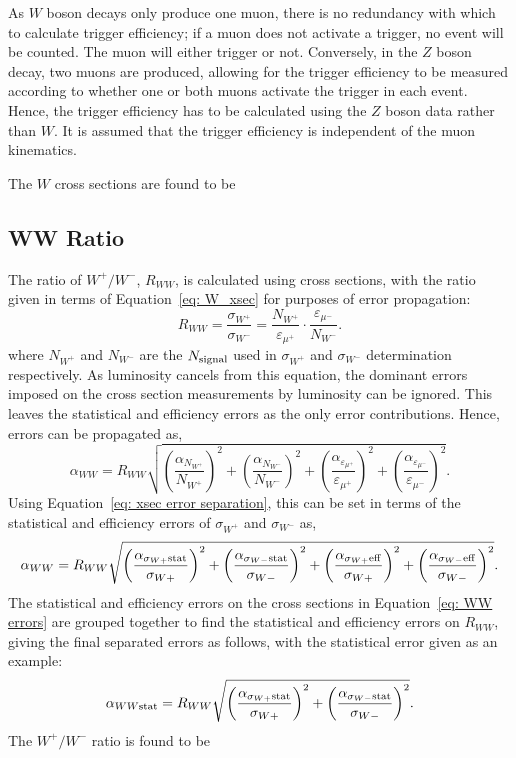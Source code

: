 \documentclass[a4paper]{article}
\begin{document}
As $W$ boson decays only produce one muon, there is no redundancy with which to calculate trigger efficiency; if a muon does not activate a trigger, no event will be counted. The muon will either trigger or not. Conversely, in the $Z$ boson decay, two muons are produced, allowing for the trigger efficiency to be measured according to whether one or both muons activate the trigger in each event. Hence, the trigger efficiency has to be calculated using the $Z$ boson data rather than $W$. It is assumed that the trigger efficiency is independent of the muon kinematics.

The $W$ cross sections are found to be



\subsection{WW Ratio}
The ratio of $W^+/W^-$, $R_{WW}$, is calculated using cross sections, with the ratio given in terms of Equation~\ref{eq: W_xsec} for purposes of error propagation:
\begin{equation}
    R_{WW} = \frac{\sigma_{W^+}}{\sigma_{W^-}} = \frac{N_{W^+}}{\varepsilon_{\mu^+}} \cdot \frac{\varepsilon_{\mu^-}}{N_{W^-}}.    
\end{equation}
where $N_{W^+}$ and $N_{W^-}$ are the $N_{\rm signal}$ used in $\sigma_{W^+}$ and $\sigma_{W^-}$ determination respectively.
As luminosity cancels from this equation, the dominant errors imposed on the cross section measurements by luminosity can be ignored.
This leaves the statistical and efficiency errors as the only error contributions.
Hence, errors can be propagated as,
\begin{equation}
    \alpha_{WW} = R_{WW}\sqrt{\left(\frac{\alpha_{N_{W^+}}}{N_{W^+}}\right)^2 + \left(\frac{\alpha_{N_{W^-}}}{N_{W^-}}\right)^2 + \left(\frac{\alpha_{\varepsilon_{\mu^+}}}{\varepsilon_{\mu^+}}\right)^2 + \left(\frac{\alpha_{\varepsilon_{\mu^-}}}{\varepsilon_{\mu^-}}\right)^2}.
\end{equation}
Using Equation~\ref{eq: xsec error separation}, this can be set in terms of the statistical and efficiency errors of $\sigma_{W^+}$ and $\sigma_{W^-}$ as,
\begin{equation}
       \alpha_{WW} = R_{WW}\sqrt{\left(\frac{\alpha_{\sigma_{W+} \rm stat}}{\sigma_{W+}}\right)^2 + \left(\frac{\alpha_{\sigma_{W-}\rm stat}}{\sigma_{W-}}\right)^2 + \left(\frac{\alpha_{\sigma_{W+} \rm eff}}{\sigma_{W+}}\right)^2 + \left(\frac{\alpha_{\sigma_{W-}\rm eff}}{\sigma_{W-}}\right)^2}.
       \label{eq: WW errors}
\end{equation}
The statistical and efficiency errors on the cross sections in Equation~\ref{eq: WW errors} are grouped together to find the statistical and efficiency errors on $R_{WW}$, giving the final separated errors as follows, with the statistical error given as an example:
\begin{equation}
    \alpha_{WW \rm stat} = R_{WW}\sqrt{\left(\frac{\alpha_{\sigma_{W+} \rm stat}}{\sigma_{W+}}\right)^2 + \left(\frac{\alpha_{\sigma_{W-}\rm stat}}{\sigma_{W-}}\right)^2}.
\end{equation}
The $W^+/W^-$ ratio is found to be

\end{document}
